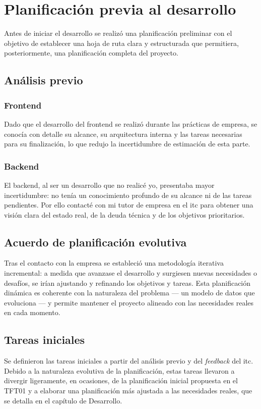 \section{Planificación previa al desarrollo}
Antes de iniciar el desarrollo se realizó una planificación preliminar con el
objetivo de establecer una hoja de ruta clara y estructurada que permitiera,
posteriormente, una planificación completa del proyecto.

\subsection{Análisis previo}

\subsubsection{Frontend}
Dado que el desarrollo del frontend se realizó durante las prácticas de
empresa, se conocía con detalle su alcance, su arquitectura interna y las
tareas necesarias para su finalización, lo que redujo la incertidumbre de
estimación de esta parte.

\subsubsection{Backend}
El backend, al ser un desarrollo que no realicé yo, presentaba mayor
incertidumbre: no tenía un conocimiento profundo de su alcance ni de las
tareas pendientes. Por ello contacté con mi tutor de empresa en el \gls{itc}
para obtener una visión clara del estado real, de la deuda técnica y de los
objetivos prioritarios.

\subsection{Acuerdo de planificación evolutiva}
Tras el contacto con la empresa se estableció una metodología iterativa incremental:
a medida que avanzase el desarrollo y surgiesen nuevas necesidades
o desafíos, se irían ajustando y refinando los objetivos y tareas. Esta
planificación dinámica es coherente con la naturaleza del problema --- un
modelo de datos que evoluciona --- y permite mantener el proyecto alineado con
las necesidades reales en cada momento.

\subsection{Tareas iniciales}
Se definieron las tareas iniciales a partir del análisis previo y del
\emph{feedback} del \gls{itc}. Debido a la naturaleza evolutiva de la
planificación, estas tareas llevaron a divergir ligeramente, en ocasiones, de la planificación inicial
propuesta en el TFT01 y a elaborar una planificación más ajustada a las
necesidades reales, que se detalla en el capítulo de Desarrollo.

